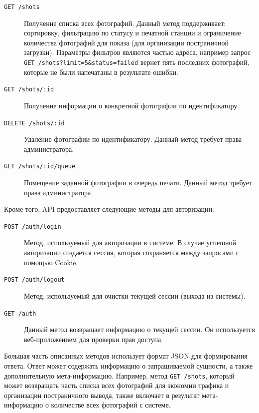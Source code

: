 \documentclass[a4paper,14pt,href,draft]{article}
\begin{document}
\begin{description}
  \item[\texttt{GET /shots}] Получение списка всех фотографий. Данный метод поддерживает: сортировку, фильтрацию по
    статусу и печатной станции и ограничение количества фотографий для показа (для организации
    постраничной загрузки). Параметры фильтров являются частью адреса, например запрос \texttt{GET /shots?limit=5\&status=failed}
    вернет пять последних фотографий, которые не были напечатаны в результате ошибки.

  \item[\texttt{GET /shots/:id}] Получение информации о конкретной фотографии по идентификатору.
  \item[\texttt{DELETE /shots/:id}] Удаление фотографии по идентификатору. Данный метод требует права
    администратора.
  \item[\texttt{GET /shots/:id/queue}] Помещение заданной фотографии в очередь печати. Данный метод требует права
    администратора.
\end{description}

Кроме того, API предоставляет следующие методы для авторизации:
\begin{description}
  \item[\texttt{POST /auth/login}] Метод, используемый для авторизации в системе. В случае успешной авторизации создается
    сессия, которая сохраняется между запросами с помощью Cookie.

  \item[\texttt{POST /auth/logout}] Метод, используемый для очистки текущей сессии (выхода из системы).

  \item[\texttt{GET /auth}] Данный метод возвращает информацию о текущей сессии. Он используется веб-приложением для
    проверки прав доступа.
\end{description}

Большая часть описанных методов использует формат JSON для формирования ответа. Ответ может содержать информацию о
запрашиваемой сущности, а также дополнительную мета-информацию. Например, метод \texttt{GET /shots}, который может
возвращать часть списка всех фотографий для экономии трафика и организации постраничного вывода, также включает в результат
мета-информацию о количестве всех фотографий с системе.
\end{document}
